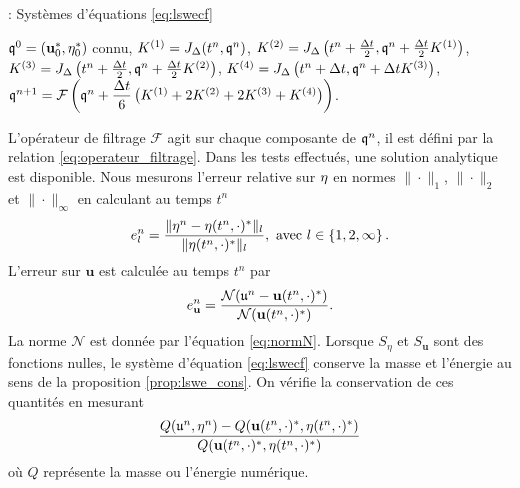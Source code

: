 \begin{center}
\begin{minipage}[H]{12cm}
  \begin{algorithm}[H]
    \caption{: Systèmes d'équations \eqref{eq:lswecf} }\label{alg:RK4_lswecf}
    \begin{algorithmic}[1]
    \State $\mathfrak{q}^0 = (\mathbf{u}_0^* , \eta_0^*)$ connu,
             \State  $K^{(1)} = J_{\Delta}(t^n, \mathfrak{q}^n)$,
             \State  $K^{(2)} = J_{\Delta}\left(t^n + \frac{\Delta t}{2}, \mathfrak{q}^n + \frac{\Delta t}{2} K^{(1)} \right)$,
             \State  $K^{(3)} = J_{\Delta}\left(t^n + \frac{\Delta t}{2}, \mathfrak{q}^n + \frac{\Delta t}{2} K^{(2)} \right)$,
             \State  $K^{(4)} = J_{\Delta}\left(t^n + \Delta t,  \mathfrak{q}^n + \Delta t K^{(3)} \right)$,  
             \State  $\mathfrak{q}^{n+1} = \mathcal{F}\left( \mathfrak{q}^n  + \dfrac{\Delta t}{6} \left( K^{(1)} + 2 K^{(2)} + 2 K^{(3)} + K^{(4)} \right) \right)$.
            \EndFor
    \end{algorithmic}
    \end{algorithm}
\end{minipage}
\end{center} 

L'opérateur de filtrage $\mathcal{F}$ agit sur chaque composante de $\mathfrak{q}^n$, il est défini par la relation \eqref{eq:operateur_filtrage}. Dans les tests effectués, une solution analytique est disponible. Nous mesurons l'erreur relative sur $\mathbf{\eta}$ en normes $\| \cdot \|_1$, $\| \cdot \|_2$ et $\| \cdot \|_{\infty}$ en calculant au temps $t^n$
\begin{equation}
e_{l}^n = \dfrac{\| \mathbf{\eta}^n - \eta(t^n, \cdot)^* \|_{l}}{\| \eta(t^n, \cdot)^* \|_{l}}, \text{ avec } l \in \left\lbrace 1, 2, \infty \right\rbrace.
\end{equation}
L'erreur sur $\mathbf{u}$  est calculée au temps $t^n$ par
\begin{equation}
e_{\mathbf{u}}^n = \dfrac{\mathcal{N}(\mathfrak{u}^n - \mathbf{u}(t^n , \cdot)^*)}{\mathcal{N}(\mathbf{u}(t^n , \cdot)^*)}.
\end{equation}
La norme $\mathcal{N}$ est donnée par l'équation \eqref{eq:normN}. Lorsque $S_{\eta}$ et $S_{\mathbf{u}}$ sont des fonctions nulles, le système d'équation \eqref{eq:lswecf} conserve la masse et l'énergie au sens de la proposition \ref{prop:lswe_cons}. On vérifie la conservation de ces quantités en mesurant 
\begin{equation}
\dfrac{Q(\mathfrak{u}^n, \mathbf{\eta}^n)-Q(\mathbf{u}(t^n, \cdot)^*, \eta(t^n, \cdot)^*)}{Q(\mathbf{u}(t^n,\cdot)^*, \eta(t^n, \cdot)^*)}
\end{equation}
où $Q$ représente la masse ou l'énergie numérique.

